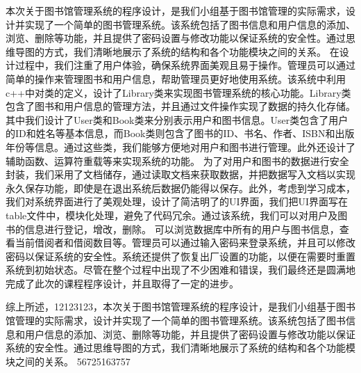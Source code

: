 \documentclass{article}
\begin{document}
本次关于图书馆管理系统的程序设计，是我们小组基于图书馆管理的实际需求，设计并实现了一个简单的图书管理系统。该系统包括了图书信息和用户信息的添加、浏览、删除等功能，并且提供了密码设置与修改功能以保证系统的安全性。通过思维导图的方式，我们清晰地展示了系统的结构和各个功能模块之间的关系。
在设计过程中，我们注重了用户体验，确保系统界面美观且易于操作。管理员可以通过简单的操作来管理图书和用户信息，帮助管理员更好地使用系统。该系统中利用c++中对类的定义，设计了Library类来实现图书管理系统的核心功能。Library类包含了图书和用户信息的管理方法，并且通过文件操作实现了数据的持久化存储。
其中我们设计了User类和Book类来分别表示用户和图书信息。User类包含了用户的ID和姓名等基本信息，而Book类则包含了图书的ID、书名、作者、ISBN和出版年份等信息。通过这些类，我们能够方便地对用户和图书进行管理。此外还设计了辅助函数、运算符重载等来实现系统的功能。
为了对用户和图书的数据进行安全封装，我们采用了文档储存，通过读取文档来获取数据，并把数据写入文档以实现永久保存功能，即使是在退出系统后数据仍能得以保存。此外，考虑到学习成本，我们对系统界面进行了美观处理，设计了简洁明了的UI界面，我们把UI界面写在table文件中，模块化处理，避免了代码冗余。通过该系统，我们可以对用户及图书的信息进行登记，增改，删除。
可以浏览数据库中所有的用户与图书信息，查看当前借阅者和借阅数目等。管理员可以通过输入密码来登录系统，并且可以修改密码以保证系统的安全性。系统还提供了恢复出厂设置的功能，以便在需要时重置系统到初始状态。尽管在整个过程中出现了不少困难和错误，我们最终还是圆满地完成了此次的课程程序设计，并且取得了一定的进步。

综上所述，12123123，本次关于图书馆管理系统的程序设计，是我们小组基于图书馆管理的实际需求，设计并实现了一个简单的图书管理系统。该系统包括了图书信息和用户信息的添加、浏览、删除等功能，并且提供了密码设置与修改功能以保证系统的安全性。通过思维导图的方式，我们清晰地展示了系统的结构和各个功能模块之间的关系。 56725163757
\end{document}
